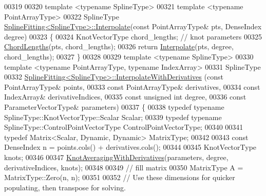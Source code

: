 \begin{DoxyCode}
00319 
00320   \textcolor{keyword}{template} <\textcolor{keyword}{typename} SplineType>
00321   \textcolor{keyword}{template} <\textcolor{keyword}{typename} Po\textcolor{keywordtype}{int}ArrayType>
00322   SplineType \hyperlink{group___splines___module_adc80b6f0dd0dbbea28130fb254626874}{SplineFitting<SplineType>::Interpolate}(\textcolor{keyword}{const} 
      PointArrayType& pts, DenseIndex degree)
00323   \{
00324     KnotVectorType chord\_lengths; \textcolor{comment}{// knot parameters}
00325     \hyperlink{group___splines___module_ga1b4cbde5d98411405871accf877552d2}{ChordLengths}(pts, chord\_lengths);
00326     \textcolor{keywordflow}{return} \hyperlink{group___splines___module_adc80b6f0dd0dbbea28130fb254626874}{Interpolate}(pts, degree, chord\_lengths);
00327   \}
00328   
00329   \textcolor{keyword}{template} <\textcolor{keyword}{typename} SplineType>
00330   \textcolor{keyword}{template} <\textcolor{keyword}{typename} Po\textcolor{keywordtype}{int}ArrayType, \textcolor{keyword}{typename} IndexArray>
00331   SplineType 
00332   \hyperlink{group___splines___module_a7bd937fdcfa168dbdc27932886a4da9f}{SplineFitting<SplineType>::InterpolateWithDerivatives}
      (\textcolor{keyword}{const} PointArrayType& points,
00333                                                         \textcolor{keyword}{const} PointArrayType& derivatives,
00334                                                         \textcolor{keyword}{const} IndexArray& derivativeIndices,
00335                                                         \textcolor{keyword}{const} \textcolor{keywordtype}{unsigned} \textcolor{keywordtype}{int} degree,
00336                                                         \textcolor{keyword}{const} ParameterVectorType& parameters)
00337   \{
00338     \textcolor{keyword}{typedef} \textcolor{keyword}{typename} SplineType::KnotVectorType::Scalar Scalar;      
00339     \textcolor{keyword}{typedef} \textcolor{keyword}{typename} SplineType::ControlPointVectorType ControlPointVectorType;
00340 
00341     \textcolor{keyword}{typedef} Matrix<Scalar, Dynamic, Dynamic> MatrixType;
00342 
00343     \textcolor{keyword}{const} DenseIndex n = points.cols() + derivatives.cols();
00344     
00345     KnotVectorType knots;
00346 
00347     \hyperlink{group___splines___module_gae10a6f9b6ab7fb400a2526b6382c533b}{KnotAveragingWithDerivatives}(parameters, degree, derivativeIndices, knots);
00348     
00349     \textcolor{comment}{// fill matrix}
00350     MatrixType A = MatrixType::Zero(n, n);
00351 
00352     \textcolor{comment}{// Use these dimensions for quicker populating, then transpose for solving.}

\end{DoxyCode}
